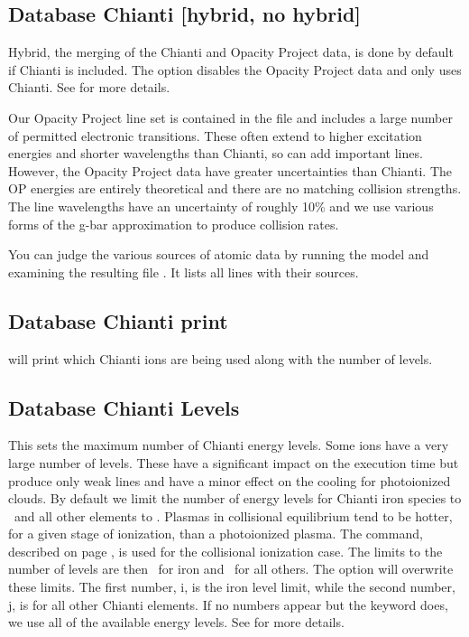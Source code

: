 \subsection{Database Chianti [hybrid, no hybrid]} 
Hybrid, the merging of the Chianti and Opacity Project data, 
is done by default if Chianti is included.
The  option disables the Opacity Project data and only uses Chianti.
See \citet{2013MNRAS.429.3133L} for more details.

Our Opacity Project line set is contained in the file  and
includes a large number of permitted electronic transitions. These often
extend to higher excitation energies and shorter wavelengths than Chianti,
so can add important lines. However, the Opacity Project data have greater
uncertainties than Chianti. The OP energies are entirely theoretical and
there are no matching collision strengths.
The line wavelengths have an uncertainty of roughly 10\% and we use
various forms of the g-bar approximation to produce collision rates.

You can judge the various sources of atomic data by running the model
 and examining the resulting file .
It lists all lines with their sources.

\subsection{Database Chianti print} 
will print which Chianti ions are being used
along with the number of levels.
 
\subsection{Database Chianti Levels} 
\label{sec:AtomChiantiLevels}
This sets the maximum number of Chianti energy levels. 
Some ions have a very large number of levels.
These have a significant impact
on the execution time but produce only weak lines and have a minor effect
on the cooling for photoionized clouds.
By default we limit the number of energy levels for Chianti iron species to 
\nDefaultPhotoLevelsFe\ and all other elements to \nDefaultPhotoLevels.
Plasmas in collisional equilibrium tend to be hotter, for a given
stage of ionization, than a photoionized plasma.  
The  command, described on
page \pageref{sec:CommandCoronalEquilibrium}, is used for
the collisional ionization case.
The limits to the number of levels are then \nDefaultCollLevelsFe\ for iron 
and \nDefaultCollLevels\ for all others.
The  option will overwrite these limits.
The first number, i, is the iron level limit, while the second number, 
j, is for all other Chianti elements.
If no numbers appear but the keyword  does, we use all 
of the available energy levels.
See \citet{2013MNRAS.429.3133L} for more details.

